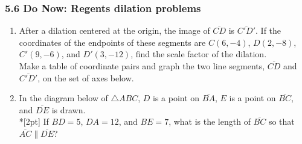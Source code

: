 \documentclass[12pt, twoside]{article}
\begin{document}
\subsubsection*{5.6 Do Now: Regents dilation problems}
 \begin{enumerate}


\item After a dilation centered at the origin, the image of $\overline{CD}$ is $\overline{C'D'}$. If the coordinates of the endpoints of these segments are $C(6,-4)$, $D(2,-8)$, $C'(9,-6)$, and $D'(3,-12)$, find the scale factor of the dilation.\\[0.25cm]
Make a table of coordinate pairs and graph the two line segments,  $\overline{CD}$ and  $\overline{C'D'}$, on the set of axes below.
  \begin{flushright}
  \end{flushright}


 \item In the diagram below of $\triangle ABC$, $D$ is a point on $\overline{BA}$, $E$ is a point on $\overline{BC}$, and $\overline{DE}$ is drawn. \\*[2pt] 
 If $BD=5$, $DA=12$, and $BE=7$, what is the length of $\overline{BC}$ so that $\overline{AC} \parallel \overline{DE}$?
 
 \begin{flushright}
   \end{flushright}


\newpage


\end{enumerate}
\end{document}
